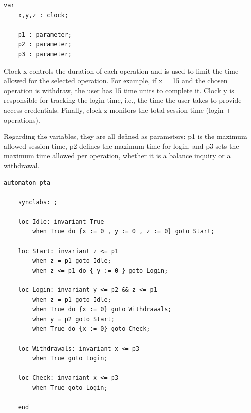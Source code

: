 \begin{lstlisting}[language=UPPAAL]
    var
    x,y,z : clock;

    p1 : parameter;
    p2 : parameter;
    p3 : parameter;
\end{lstlisting}


Clock x controls the duration of each operation and is used to limit the time allowed for the selected operation. For example, if x = 15 and the chosen operation is withdraw, the user has 15 time units to complete it. Clock y is responsible for tracking the login time, i.e., the time the user takes to provide access credentials.
Finally, clock z monitors the total session time (login + operations).

Regarding the variables, they are all defined as parameters: p1 is the maximum allowed session time, p2 defines the maximum time for login, and p3 sets the maximum time allowed per operation, whether it is a balance inquiry or a withdrawal.

\begin{lstlisting}[language=UPPAAL]
    automaton pta
    
    synclabs: ;

    loc Idle: invariant True
    	when True do {x := 0 , y := 0 , z := 0} goto Start;
    
    loc Start: invariant z <= p1
    	when z = p1 goto Idle;
    	when z <= p1 do { y := 0 } goto Login;
    
    loc Login: invariant y <= p2 && z <= p1
    	when z = p1 goto Idle;
    	when True do {x := 0} goto Withdrawals;
    	when y = p2 goto Start;
    	when True do {x := 0} goto Check;
    
    loc Withdrawals: invariant x <= p3
    	when True goto Login;
    
    loc Check: invariant x <= p3
    	when True goto Login;
    
    end
\end{lstlisting}


